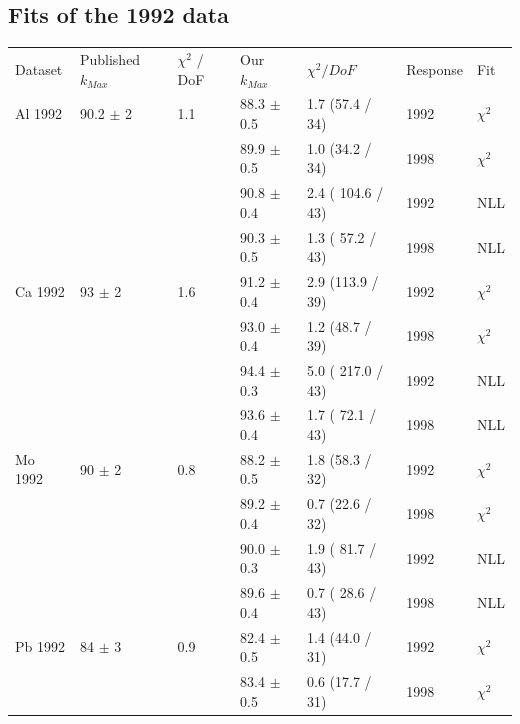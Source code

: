 \subsection { Fits of the 1992 data }
\begin{table}[H]
  \begin{center}
    \begin{tabular}{|l||l|l|l|l|l|l|}
      \hline
      Dataset & Published $k_{Max}$ & $\chi^2$ / DoF & Our $k_{Max}$ & $\chi^2 / DoF$  & Response & Fit \\
      \hhline{|=||=|=|=|=|=|=|}
       Al 1992   & 90.2 $\pm$ 2   & 1.1 & 88.3 $\pm$ 0.5 & 1.7 (57.4 / 34)  & 1992 & $\chi^2$ \\  
                 &                &     & 89.9 $\pm$ 0.5 & 1.0 (34.2 / 34)  & 1998 & $\chi^2$ \\  
                                       
                 &                &     & 90.8 $\pm$ 0.4 & 2.4 ( 104.6 / 43) & 1992 & NLL \\
                 &                &     & 90.3 $\pm$ 0.5 & 1.3 ( 57.2 / 43)  & 1998 & NLL \\
       \hline                           
       Ca 1992   & 93   $\pm$ 2   & 1.6 & 91.2 $\pm$ 0.4 & 2.9 (113.9 / 39) & 1992 & $\chi^2$ \\  
                 &                &     & 93.0 $\pm$ 0.4 & 1.2 (48.7 / 39)  & 1998 & $\chi^2$ \\  
                                                                            
                &                &     & 94.4 $\pm$ 0.3 & 5.0 ( 217.0 / 43) & 1992 & NLL \\
                &                &     & 93.6 $\pm$ 0.4 & 1.7 ( 72.1 / 43) & 1998 & NLL \\
      \hline                           
       Mo 1992   & 90   $\pm$ 2   & 0.8 & 88.2 $\pm$ 0.5 & 1.8 (58.3 / 32)  & 1992 & $\chi^2$ \\  
                 &                &     & 89.2 $\pm$ 0.4 & 0.7 (22.6 / 32)  & 1998 & $\chi^2$ \\  
                                                                            
                &                &     & 90.0 $\pm$ 0.3 & 1.9 ( 81.7 / 43) & 1992 & NLL \\
                &                &     & 89.6 $\pm$ 0.4 & 0.7 ( 28.6 / 43) & 1998 & NLL \\
      \hline                           
       Pb 1992   & 84   $\pm$ 3   & 0.9 & 82.4 $\pm$ 0.5 & 1.4 (44.0 / 31)  & 1992 & $\chi^2$ \\  
                 &                &     & 83.4 $\pm$ 0.5 & 0.6 (17.7 / 31)  & 1998 & $\chi^2$ \\  
                                        

\end{tabular}
\end{center}
\end{table}
